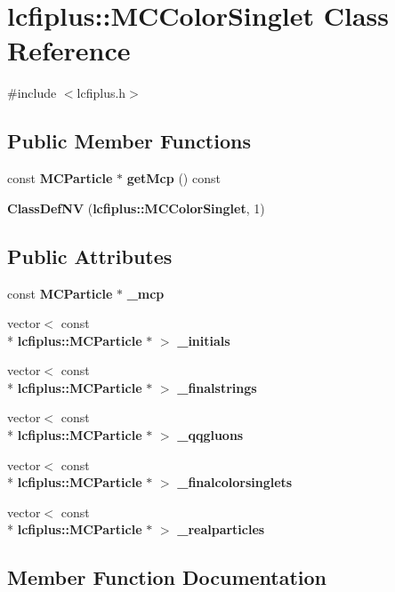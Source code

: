 \section{lcfiplus\-:\-:M\-C\-Color\-Singlet Class Reference}
\label{classlcfiplus_1_1MCColorSinglet}


{\ttfamily \#include $<$lcfiplus.\-h$>$}

\subsection*{Public Member Functions}
\begin{DoxyCompactItemize}
\item 
const {\bf M\-C\-Particle} $\ast$ {\bf get\-Mcp} () const 
\item 
{\bf Class\-Def\-N\-V} ({\bf lcfiplus\-::\-M\-C\-Color\-Singlet}, 1)
\end{DoxyCompactItemize}
\subsection*{Public Attributes}
\begin{DoxyCompactItemize}
\item 
const {\bf M\-C\-Particle} $\ast$ {\bf \-\_\-mcp}
\item 
vector$<$ const \\*
{\bf lcfiplus\-::\-M\-C\-Particle} $\ast$ $>$ {\bf \-\_\-initials}
\item 
vector$<$ const \\*
{\bf lcfiplus\-::\-M\-C\-Particle} $\ast$ $>$ {\bf \-\_\-finalstrings}
\item 
vector$<$ const \\*
{\bf lcfiplus\-::\-M\-C\-Particle} $\ast$ $>$ {\bf \-\_\-qqgluons}
\item 
vector$<$ const \\*
{\bf lcfiplus\-::\-M\-C\-Particle} $\ast$ $>$ {\bf \-\_\-finalcolorsinglets}
\item 
vector$<$ const \\*
{\bf lcfiplus\-::\-M\-C\-Particle} $\ast$ $>$ {\bf \-\_\-realparticles}
\end{DoxyCompactItemize}


\subsection{Member Function Documentation}
